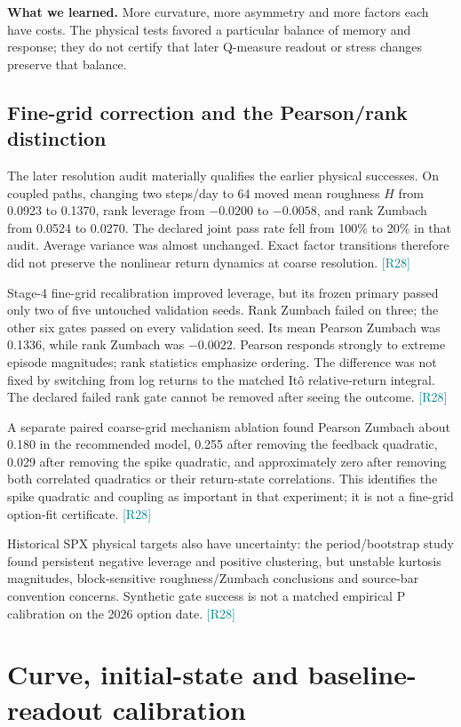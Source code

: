 \documentclass[11pt,a4paper]{article}
\newcommand{\src}[1]{\textcolor{teal}{\small[#1]}}
\newcommand{\lesson}[1]{\par\smallskip\noindent\colorbox{teal!9}{\parbox{\dimexpr\linewidth-2\fboxsep}{\textbf{What we learned.} #1}}\par\smallskip}
\begin{document}
\lesson{More curvature, more asymmetry and more factors each have costs. The physical tests favored a particular balance of memory and response; they do not certify that later Q-measure readout or stress changes preserve that balance.}

\subsection{Fine-grid correction and the Pearson/rank distinction}
The later resolution audit materially qualifies the earlier physical successes. On coupled paths, changing two steps/day to 64 moved mean roughness $H$ from 0.0923 to 0.1370, rank leverage from $-0.0200$ to $-0.0058$, and rank Zumbach from 0.0524 to 0.0270. The declared joint pass rate fell from 100\% to 20\% in that audit. Average variance was almost unchanged. Exact factor transitions therefore did not preserve the nonlinear return dynamics at coarse resolution. \src{R28}

Stage-4 fine-grid recalibration improved leverage, but its frozen primary passed only two of five untouched validation seeds. Rank Zumbach failed on three; the other six gates passed on every validation seed. Its mean Pearson Zumbach was 0.1336, while rank Zumbach was $-0.0022$. Pearson responds strongly to extreme episode magnitudes; rank statistics emphasize ordering. The difference was not fixed by switching from log returns to the matched It\^o relative-return integral. The declared failed rank gate cannot be removed after seeing the outcome. \src{R28}

A separate paired coarse-grid mechanism ablation found Pearson Zumbach about 0.180 in the recommended model, 0.255 after removing the feedback quadratic, 0.029 after removing the spike quadratic, and approximately zero after removing both correlated quadratics or their return-state correlations. This identifies the spike quadratic and coupling as important in that experiment; it is not a fine-grid option-fit certificate. \src{R28}

Historical SPX physical targets also have uncertainty: the period/bootstrap study found persistent negative leverage and positive clustering, but unstable kurtosis magnitudes, block-sensitive roughness/Zumbach conclusions and source-bar convention concerns. Synthetic gate success is not a matched empirical P calibration on the 2026 option date. \src{R28}

\section{Curve, initial-state and baseline-readout calibration}
\end{document}
